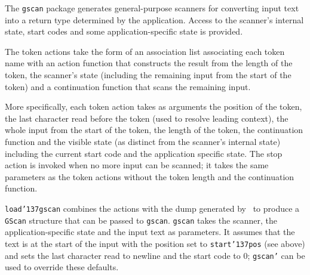 
The \mbox{\tt gscan} package generates general-purpose scanners for converting input
text into a return type determined by the application.  Access to the scanner's
internal state, start codes and some application-specific state is provided.
 
The token actions take the form of an association list associating each token
name with an action function that constructs the result from the length of the
token, the scanner's state (including the remaining input from the start of the
token) and a continuation function that scans the remaining input.
 
More specifically, each token action takes as arguments the position of the
token, the last character read before the token (used to resolve leading
context), the whole input from the start of the token, the length of the token,
the continuation function and the visible state (as distinct from the scanner's
internal state) including the current start code and the application specific
state.  The stop action is invoked when no more input can be scanned; it takes
the same parameters as the token actions without the token length and the
continuation function.



\mbox{\tt load{\char'137}gscan} combines the actions with the dump generated by \lx\ to produce a
\mbox{\tt GScan} structure that can be passed to \mbox{\tt gscan}.  \mbox{\tt gscan} takes the scanner,
the application-specific state and the input text as parameters.  It assumes
that the text is at the start of the input with the position set to
\mbox{\tt start{\char'137}pos} (see above) and sets the last character read to newline and the
start code to 0; \mbox{\tt gscan'} can be used to override these defaults.

